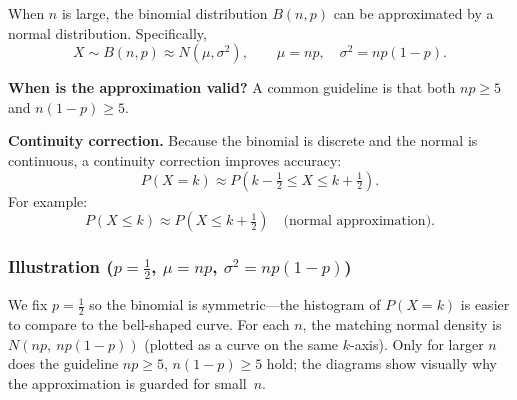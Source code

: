 
When $n$ is large, the binomial distribution $B(n,p)$ can be approximated by a normal distribution. Specifically,
\[
X \sim B(n,p) \approx N\!\left(\mu, \sigma^2\right), \qquad \mu = np, \quad \sigma^2 = np(1-p).
\]

\textbf{When is the approximation valid?} A common guideline is that both $np \geq 5$ and $n(1-p) \geq 5$.

\textbf{Continuity correction.} Because the binomial is discrete and the normal is continuous, a continuity correction improves accuracy:
\[
P(X = k) \approx P\!\left(k - \tfrac{1}{2} \leq X \leq k + \tfrac{1}{2}\right).
\]
For example:
\[
P(X \leq k) \approx P\!\left(X \leq k + \tfrac{1}{2}\right) \quad \text{(normal approximation)}.
\]

\subsubsection*{Illustration ($p=\tfrac{1}{2}$, $\mu=np$, $\sigma^2=np(1-p)$)}
We fix $p=\frac{1}{2}$ so the binomial is symmetric---the histogram of $P(X=k)$ is easier to compare to the bell-shaped curve. For each $n$, the matching normal density is $N(np,\ np(1-p))$ (plotted as a curve on the same $k$-axis). Only for larger $n$ does the guideline $np\ge 5$, $n(1-p)\ge 5$ hold; the diagrams show visually why the approximation is guarded for small~$n$.

